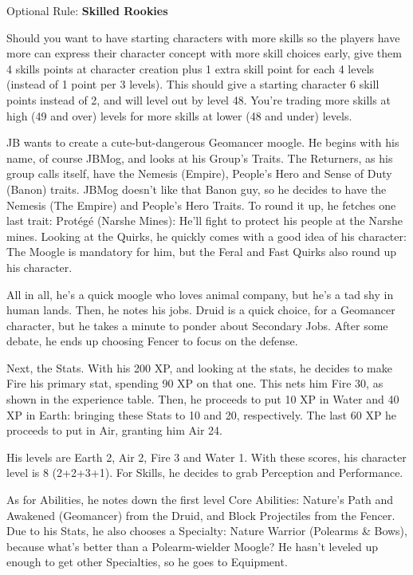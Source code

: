 \clearpage
{\centering%
}
{\color{bocoblue}\small%
Optional Rule: \textbf{Skilled Rookies}

Should you want to have starting characters with more skills so the players have more can express their character concept with more skill choices early, give them 4 skills points at character creation plus 1 extra skill point for each 4 levels (instead of 1 point per 3 levels). This should give a starting character 6 skill points instead of 2, and will level out by level 48. You're trading more skills at high (49 and over) levels for more skills at lower (48 and under) levels.%
}

\begin{multimog}
JB wants to create a cute-but-dangerous Geomancer moogle. He begins with his name, of course JBMog, and looks at his Group's Traits. The Returners, as his group calls itself, have the Nemesis (Empire), People's Hero and Sense of Duty (Banon) traits. JBMog doesn't like that Banon guy, so he decides to have the Nemesis (The Empire) and People's Hero Traits. To round it up, he fetches one last trait: Protégé (Narshe Mines): He'll fight to protect his people at the Narshe mines. Looking at the Quirks, he quickly comes with a good idea of his character: The Moogle is mandatory for him, but the Feral and Fast Quirks also round up his character.

All in all, he's a quick moogle who loves animal company, but he's a tad shy in human lands. Then, he notes his jobs. Druid is a quick choice, for a Geomancer character, but he takes a minute to ponder about Secondary Jobs. After some debate, he ends up choosing Fencer to focus on the defense.

Next, the Stats. With his 200 XP, and looking at the stats, he decides to make Fire his primary stat, spending 90 XP on that one. This nets him Fire 30, as shown in the experience table. Then, he proceeds to put 10 XP in Water and 40 XP in Earth: bringing these Stats to 10 and 20, respectively. The last 60 XP he proceeds to put in Air, granting him Air 24.

His levels are Earth 2, Air 2, Fire 3 and Water 1. With these scores, his character level is 8 (2+2+3+1). For Skills, he decides to grab Perception and Performance.

As for Abilities, he notes down the first level Core Abilities: Nature's Path and Awakened (Geomancer) from the Druid, and Block Projectiles from the Fencer. Due to his Stats, he also chooses a Specialty: Nature Warrior (Polearms \& Bows), because what’s better than a Polearm-wielder Moogle? He hasn't leveled up enough to get other Specialties, so he goes to Equipment.


\end{multimog}
